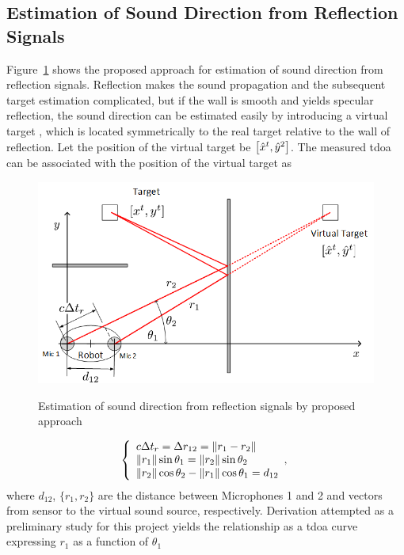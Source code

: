 \documentclass[letterpaper, 10 pt, conference]{ieeeconf}  %
\begin{document}
\subsection{Estimation of Sound Direction from Reflection Signals} Figure~\ref{fig:reflection} shows the proposed approach for estimation of sound direction from reflection signals.  Reflection makes the sound propagation and the subsequent target estimation complicated, but if the wall is smooth and yields specular reflection, the sound direction can be estimated easily by introducing a virtual target \cite{pulkki1997}, which is located symmetrically to the real target relative to the wall of reflection. Let the position of the virtual target be $\left [ \hat x^t, \hat y^2 \right ]$.  The measured \gls{tdoa} can be associated with the position of the virtual target as\\
\begin{figure}[h]
    {\centering
        \includegraphics[width=0.9\columnwidth]{Figures/Reflection_notation.png}
    }
    \caption{\footnotesize {Estimation of sound direction from reflection signals by proposed approach} }
    \label{fig:reflection}
\end{figure}
\begin{multline}\label{eq:reflection}
\left\{
\begin{array}{ll}
c\Delta t_r = \Delta r_{12}=\lVert{r_1-r_2}\rVert\\
\lVert{r_1}\rVert\sin{\theta_1}=\lVert{r_2}\rVert\sin{\theta_2}\\
\lVert{r_2}\rVert\cos{\theta_2}-\lVert{r_1}\rVert\cos{\theta_1}=d_{12}
\end{array},
\right.
\end{multline}
where $d_{12}$, $\{r_1,r_2\}$ are the distance between Microphones 1 and 2 and vectors from sensor to the virtual sound source, respectively. Derivation attempted as a preliminary study for this project yields the relationship as a \gls{tdoa} curve expressing $r_1$ as a function of $\theta_1$
\end{document}
